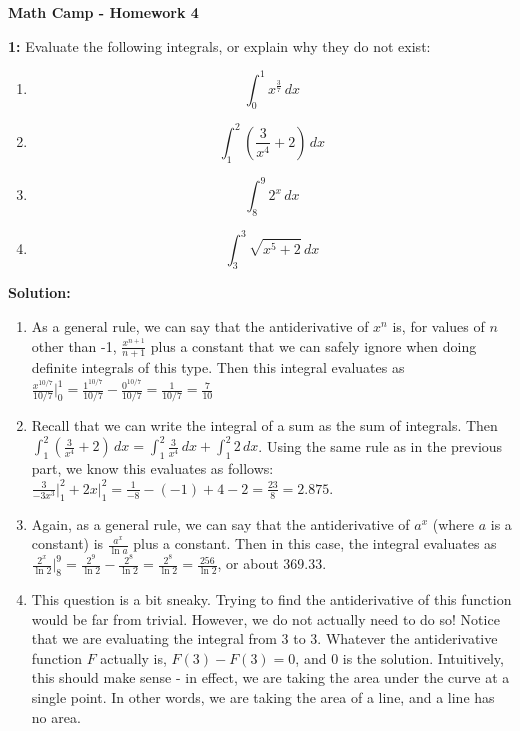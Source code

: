 \documentclass[12pt]{article}
\begin{document}
\centerline{\bf Math Camp - Homework 4}


\bigskip

\noindent \textbf{1:} Evaluate the following integrals, or explain why they do not exist:

\medskip

\begin{multicols}{2}
\begin{enumerate}
\item $$\int_0^1 x^{\frac{3}{7}} \,dx$$
\item $$\int_1^2 \left(\frac{3}{x^4} + 2\right) \,dx$$
\item $$\int_8^9 2^x \,dx$$
\item $$\int_3^3 \sqrt{x^5 + 2} \,dx$$
\end{enumerate}
\end{multicols}


\noindent \textbf{Solution:}
\begin{enumerate}
\item As a general rule, we can say that the antiderivative of $x^n$ is, for values of $n$ other than -1, $\frac{x^{n+1}}{n+1}$ plus a constant that we can safely ignore when doing definite integrals of this type. Then this integral evaluates as $\frac{x^{10/7}}{10/7} \bigg|_0^1 = \frac{1^{10/7}}{10/7} - \frac{0^{10/7}}{10/7} = \frac{1}{10/7} = \frac{7}{10}$
\medskip
\item Recall that we can write the integral of a sum as the sum of integrals. Then $\int_1^2 \left(\frac{3}{x^4} + 2\right) \,dx = \int_1^2 \frac{3}{x^4} \, dx + \int_1^2 2 \, dx$. Using the same rule as in the previous part, we know this evaluates as follows: $\frac{3}{-3x^{3}}\bigg|_1^2 + 2x\bigg|_1^2 = \frac{1}{-8} - (-1) + 4 - 2 = \frac{23}{8} = 2.875$.
\medskip
\item Again, as a general rule, we can say that the antiderivative of $a^x$ (where $a$ is a constant) is $\frac{a^x}{\ln a}$ plus a constant. Then in this case, the integral evaluates as $\frac{2^x}{\ln 2}\bigg|_8^9 = \frac{2^9}{\ln 2} - \frac{2^8}{\ln2} = \frac{2^8}{\ln2} = \frac{256}{\ln2}$, or about 369.33.
\medskip 
\item This question is a bit sneaky. Trying to find the antiderivative of this function would be far from trivial. However, we do not actually need to do so! Notice that we are evaluating the integral from 3 to 3. Whatever the antiderivative function $F$ actually is, $F(3) - F(3) = 0$, and 0 is the solution. Intuitively, this should make sense - in effect, we are taking the area under the curve at a single point. In other words, we are taking the area of a line, and a line has no area.

\end{enumerate}
\end{document}
